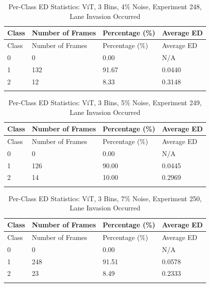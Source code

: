 
\begin{longtable}{@{}llll@{}}
\toprule
Class & Number of Frames & Percentage (\%) & Average ED \\
\midrule
\endfirsthead
\toprule
Class & Number of Frames & Percentage (\%) & Average ED \\
\midrule
\endhead
0 & 0 & 0.00 & N/A \\
1 & 132 & 91.67 & 0.0440 \\
2 & 12 & 8.33 & 0.3148 \\
\bottomrule
\caption{Per-Class ED Statistics: ViT, 3 Bins, 4\% Noise, Experiment 248, Lane Invasion Occurred}
\label{tab:exp248_ViT_3bins_4noise}
\end{longtable}
        


\begin{longtable}{@{}llll@{}}
\toprule
Class & Number of Frames & Percentage (\%) & Average ED \\
\midrule
\endfirsthead
\toprule
Class & Number of Frames & Percentage (\%) & Average ED \\
\midrule
\endhead
0 & 0 & 0.00 & N/A \\
1 & 126 & 90.00 & 0.0445 \\
2 & 14 & 10.00 & 0.2969 \\
\bottomrule
\caption{Per-Class ED Statistics: ViT, 3 Bins, 5\% Noise, Experiment 249, Lane Invasion Occurred}
\label{tab:exp249_ViT_3bins_5noise}
\end{longtable}
        


\begin{longtable}{@{}llll@{}}
\toprule
Class & Number of Frames & Percentage (\%) & Average ED \\
\midrule
\endfirsthead
\toprule
Class & Number of Frames & Percentage (\%) & Average ED \\
\midrule
\endhead
0 & 0 & 0.00 & N/A \\
1 & 248 & 91.51 & 0.0578 \\
2 & 23 & 8.49 & 0.2333 \\
\bottomrule
\caption{Per-Class ED Statistics: ViT, 3 Bins, 7\% Noise, Experiment 250, Lane Invasion Occurred}
\label{tab:exp250_ViT_3bins_7noise}
\end{longtable}
        

